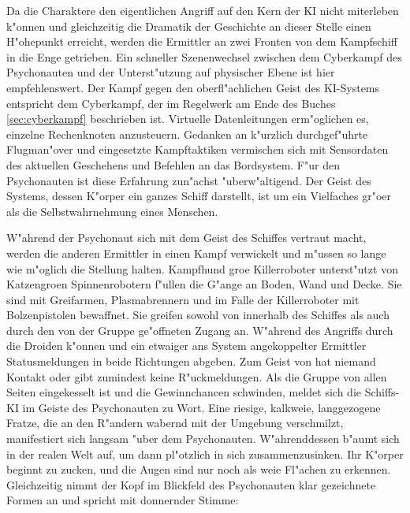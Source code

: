 Da die Charaktere den eigentlichen Angriff auf den Kern der KI nicht miterleben k"onnen und gleichzeitig die Dramatik der Geschichte an dieser Stelle einen H"ohepunkt erreicht, werden die Ermittler an zwei Fronten von dem Kampfschiff in die Enge getrieben. Ein schneller Szenenwechsel zwischen dem Cyberkampf des Psychonauten und der Unterst"utzung auf physischer Ebene ist hier empfehlenswert. Der Kampf gegen den oberfl"achlichen Geist des KI-Systems entspricht dem Cyberkampf, der im Regelwerk am Ende des Buches  \cref{sec:cyberkampf} beschrieben ist. Virtuelle Datenleitungen erm"oglichen es, einzelne Rechenknoten anzusteuern. Gedanken an k"urzlich durchgef"uhrte Flugman"over und eingesetzte Kampftaktiken vermischen sich mit Sensordaten des aktuellen Geschehens und Befehlen an das Bordsystem. F"ur den Psychonauten ist diese Erfahrung zun"achst "uberw"altigend. Der Geist des Systems, dessen K"orper ein ganzes Schiff darstellt, ist um ein Vielfaches gr"o\3er als die Selbstwahrnehmung eines Menschen.

W"ahrend der Psychonaut sich mit dem Geist des Schiffes vertraut macht, werden die anderen Ermittler in einen Kampf verwickelt und m"ussen so lange wie m"oglich die Stellung halten. Kampfhund gro\3e Killerroboter unterst"utzt von Katzengro\3en Spinnenrobotern f"ullen die G"ange an Boden, Wand und Decke. Sie sind mit Greifarmen, Plasmabrennern und im Falle der Killerroboter mit Bolzenpistolen bewaffnet. Sie greifen sowohl von innerhalb des Schiffes als auch durch den von der Gruppe ge"offneten Zugang an. W"ahrend des Angriffs durch die Droiden k"onnen \ml{} und ein etwaiger ans System angekoppelter Ermittler Statusmeldungen in beide Richtungen abgeben. Zum Geist von \xl{} hat niemand Kontakt oder \ml{} gibt zumindest keine R"uckmeldungen. Als die Gruppe von allen Seiten eingekesselt ist und die Gewinnchancen schwinden, meldet sich die Schiffs-KI im Geiste des Psychonauten zu Wort. Eine riesige, kalkwei\3e, langgezogene Fratze, die an den R"andern wabernd mit der Umgebung verschmilzt, manifestiert sich langsam "uber dem Psychonauten. W"ahrenddessen b"aumt sich \xl{} in der realen Welt auf, um dann pl"otzlich in sich zusammenzusinken. Ihr K"orper beginnt zu zucken, und die Augen sind nur noch als wei\3e Fl"achen zu erkennen. Gleichzeitig nimmt der Kopf im Blickfeld des Psychonauten klar gezeichnete Formen an und spricht mit donnernder Stimme:



